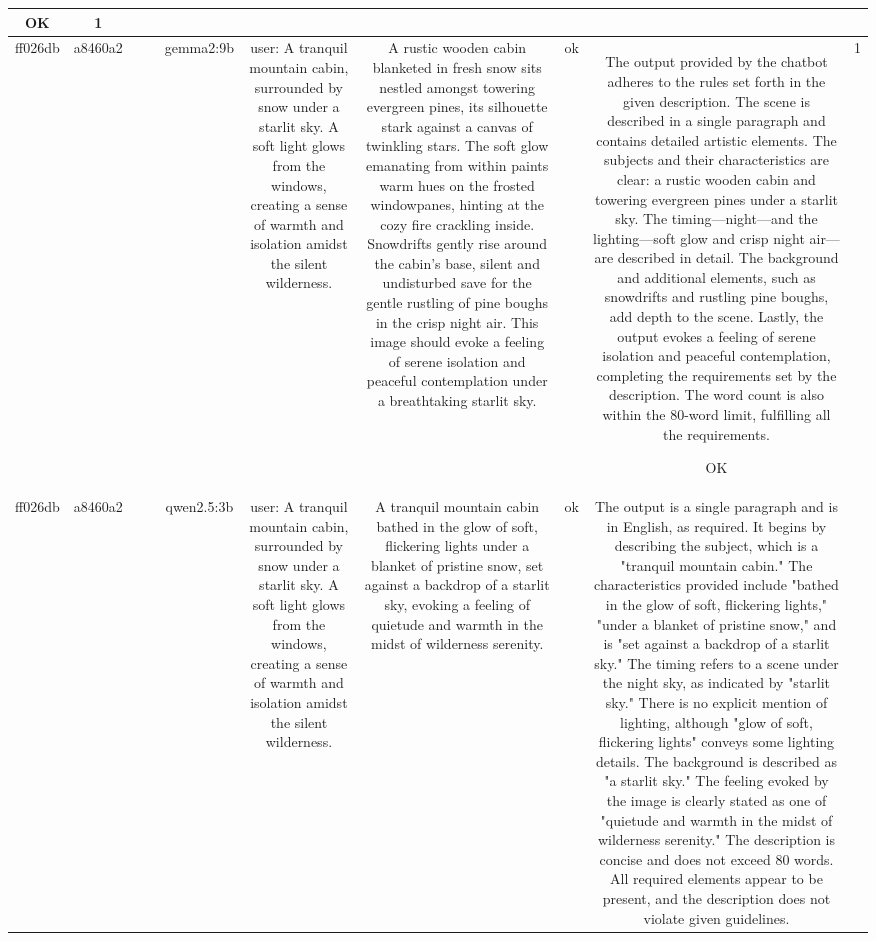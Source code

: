 \begin{table}[h!]
\begin{tabular}{|c|c|c|c|c|c|c|c|c|c|}
OK & 1\\
\hline
ff026db & a8460a2 &  &  & gemma2:9b & user: A tranquil mountain cabin, surrounded by snow under a starlit sky. A soft light glows from the windows, creating a sense of warmth and isolation amidst the silent wilderness. & A rustic wooden cabin blanketed in fresh snow sits nestled amongst towering evergreen pines, its silhouette stark against a canvas of twinkling stars.  The soft glow emanating from within paints warm hues on the frosted windowpanes, hinting at the cozy fire crackling inside. Snowdrifts gently rise around the cabin's base, silent and undisturbed save for the gentle rustling of pine boughs in the crisp night air. This image should evoke a feeling of serene isolation and peaceful contemplation under a breathtaking starlit sky.


 & ok & The output provided by the chatbot adheres to the rules set forth in the given description. The scene is described in a single paragraph and contains detailed artistic elements. The subjects and their characteristics are clear: a rustic wooden cabin and towering evergreen pines under a starlit sky. The timing—night—and the lighting—soft glow and crisp night air—are described in detail. The background and additional elements, such as snowdrifts and rustling pine boughs, add depth to the scene. Lastly, the output evokes a feeling of serene isolation and peaceful contemplation, completing the requirements set by the description. The word count is also within the 80-word limit, fulfilling all the requirements.

OK & 1\\
\hline
ff026db & a8460a2 &  &  & qwen2.5:3b & user: A tranquil mountain cabin, surrounded by snow under a starlit sky. A soft light glows from the windows, creating a sense of warmth and isolation amidst the silent wilderness. & A tranquil mountain cabin bathed in the glow of soft, flickering lights under a blanket of pristine snow, set against a backdrop of a starlit sky, evoking a feeling of quietude and warmth in the midst of wilderness serenity. & ok & The output is a single paragraph and is in English, as required. It begins by describing the subject, which is a "tranquil mountain cabin." The characteristics provided include "bathed in the glow of soft, flickering lights," "under a blanket of pristine snow," and is "set against a backdrop of a starlit sky." The timing refers to a scene under the night sky, as indicated by "starlit sky." There is no explicit mention of lighting, although "glow of soft, flickering lights" conveys some lighting details. The background is described as "a starlit sky." The feeling evoked by the image is clearly stated as one of "quietude and warmth in the midst of wilderness serenity." The description is concise and does not exceed 80 words. All required elements appear to be present, and the description does not violate given guidelines.


\end{tabular}
\end{table}
